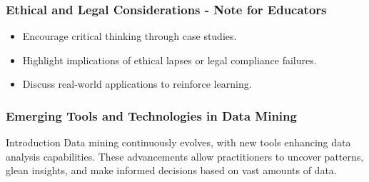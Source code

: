 \documentclass{beamer}
\begin{document}
\begin{frame}[fragile]
    \frametitle{Ethical and Legal Considerations - Note for Educators}
    \begin{itemize}
        \item Encourage critical thinking through case studies.
        \item Highlight implications of ethical lapses or legal compliance failures.
        \item Discuss real-world applications to reinforce learning.
    \end{itemize}
\end{frame}

\begin{frame}
    \frametitle{Emerging Tools and Technologies in Data Mining}
    \begin{block}{Introduction}
        Data mining continuously evolves, with new tools enhancing data analysis capabilities. These advancements allow practitioners to uncover patterns, glean insights, and make informed decisions based on vast amounts of data.
    \end{block}
\end{frame}
\end{document}
